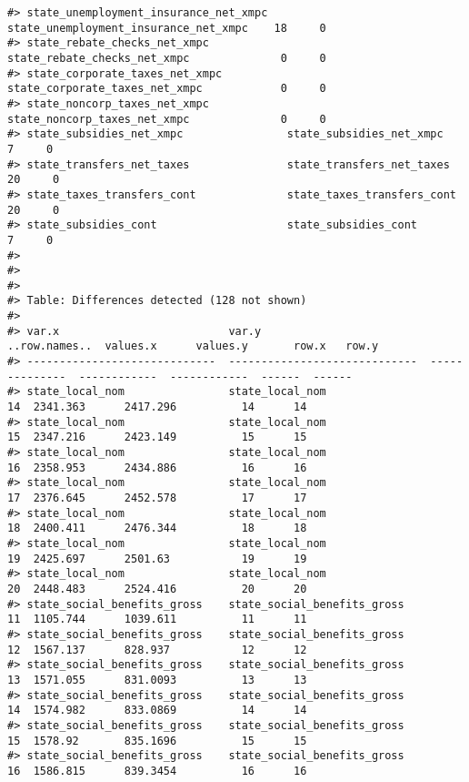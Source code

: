 \documentclass[
]{article}
\begin{document}
\begin{verbatim}
#> state_unemployment_insurance_net_xmpc   state_unemployment_insurance_net_xmpc    18     0
#> state_rebate_checks_net_xmpc            state_rebate_checks_net_xmpc              0     0
#> state_corporate_taxes_net_xmpc          state_corporate_taxes_net_xmpc            0     0
#> state_noncorp_taxes_net_xmpc            state_noncorp_taxes_net_xmpc              0     0
#> state_subsidies_net_xmpc                state_subsidies_net_xmpc                  7     0
#> state_transfers_net_taxes               state_transfers_net_taxes                20     0
#> state_taxes_transfers_cont              state_taxes_transfers_cont               20     0
#> state_subsidies_cont                    state_subsidies_cont                      7     0
#> 
#> 
#> 
#> Table: Differences detected (128 not shown)
#> 
#> var.x                          var.y                           ..row.names..  values.x      values.y       row.x   row.y
#> -----------------------------  -----------------------------  --------------  ------------  ------------  ------  ------
#> state_local_nom                state_local_nom                            14  2341.363      2417.296          14      14
#> state_local_nom                state_local_nom                            15  2347.216      2423.149          15      15
#> state_local_nom                state_local_nom                            16  2358.953      2434.886          16      16
#> state_local_nom                state_local_nom                            17  2376.645      2452.578          17      17
#> state_local_nom                state_local_nom                            18  2400.411      2476.344          18      18
#> state_local_nom                state_local_nom                            19  2425.697      2501.63           19      19
#> state_local_nom                state_local_nom                            20  2448.483      2524.416          20      20
#> state_social_benefits_gross    state_social_benefits_gross                11  1105.744      1039.611          11      11
#> state_social_benefits_gross    state_social_benefits_gross                12  1567.137      828.937           12      12
#> state_social_benefits_gross    state_social_benefits_gross                13  1571.055      831.0093          13      13
#> state_social_benefits_gross    state_social_benefits_gross                14  1574.982      833.0869          14      14
#> state_social_benefits_gross    state_social_benefits_gross                15  1578.92       835.1696          15      15
#> state_social_benefits_gross    state_social_benefits_gross                16  1586.815      839.3454          16      16

\end{verbatim}
\end{document}
